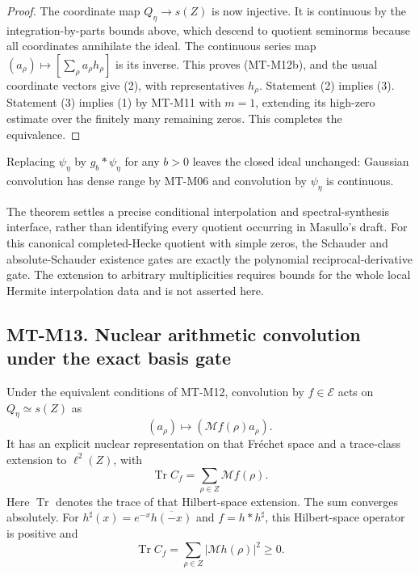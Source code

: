 \begin{proof}
The coordinate map $Q_\eta\to s(Z)$ is now injective.
It is continuous by the integration-by-parts bounds above,
which descend to quotient seminorms because all coordinates
annihilate the ideal. The continuous series map
$(a_\rho)\mapsto[\sum_\rho a_\rho h_\rho]$ is its inverse.
This proves (MT-M12b), and the usual coordinate vectors
give (2), with representatives $h_\rho$.
Statement (2) implies (3). Statement (3) implies (1)
by MT-M11 with $m=1$, extending its high-zero estimate
over the finitely many remaining zeros. This completes
the equivalence.
\end{proof}

Replacing $\psi_\eta$ by
$g_b*\psi_\eta$ for any $b>0$ leaves the closed ideal unchanged:
Gaussian convolution has dense range by MT-M06 and convolution
by $\psi_\eta$ is continuous.

The theorem settles a precise conditional interpolation and
spectral-synthesis interface, rather than identifying every
quotient occurring in Masullo's draft. For this canonical
completed-Hecke quotient with simple zeros, the Schauder and
absolute-Schauder existence gates are exactly the polynomial
reciprocal-derivative gate. The extension to arbitrary
multiplicities requires bounds for the whole local Hermite
interpolation data and is not asserted here.

\subsection*{MT-M13. Nuclear arithmetic convolution under the exact basis gate}
Under the equivalent conditions of MT-M12, convolution by
$f\in\mathcal E$ acts on $Q_\eta\simeq s(Z)$ as
\[
            (a_\rho)\longmapsto
                         (\mathcal Mf(\rho)a_\rho).
\]
It has an explicit nuclear representation on that Fr\'echet
space and a trace-class extension to $\ell^2(Z)$, with
\[
                   \operatorname{Tr}C_f
                         =\sum_{\rho\in Z}\mathcal Mf(\rho).
                                                               \tag{MT-M13}
\]
Here $\operatorname{Tr}$ denotes the trace of that Hilbert-space extension.
The sum converges absolutely. For
$h^\sharp(x)=e^{-x}\overline{h(-x)}$ and
$f=h*h^\sharp$, this Hilbert-space operator is positive and
\[
                   \operatorname{Tr}C_f
                         =\sum_{\rho\in Z}|\mathcal Mh(\rho)|^2
                         \ge0.
\]

